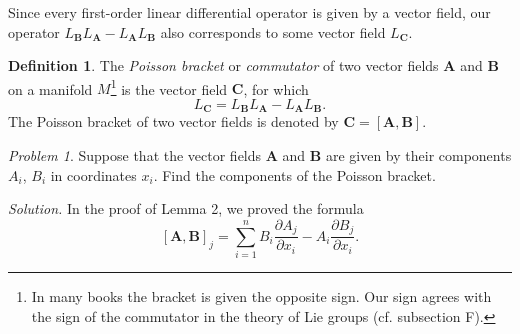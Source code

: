 \documentclass[leqno]{report}
\numberwithin{equation}{section}
\theoremstyle{plain}
\theoremstyle{definition}
\newtheorem*{defn*}{Definition}
\theoremstyle{remark}
\theoremstyle{smallcap}
\newtheorem*{prob*}{Problem}
\numberwithin{prob}{section}
\newcommand{\solution}[1]{\textit{Solution.} #1}
\begin{document}
Since every first-order linear differential operator is given by
a vector field, our operator
$L_\mathbf{B} L_\mathbf{A} - L_\mathbf{A} L_\mathbf{B}$
also corresponds to some vector field $L_\mathbf{C}$.


\begin{defn*}
  The \emph{Poisson bracket} or \emph{commutator}
  of two vector fields $\mathbf A$ and $\mathbf B$
  on a manifold $M$\footnote{In many books the bracket
    is given the opposite sign.
    Our sign agrees with  the sign of the commutator
    in the theory of Lie groups (cf. subsection F).}
  is the vector field $\mathbf C$, for which
  $$
  L_\mathbf{C} = L_\mathbf{B} L_\mathbf{A} - L_\mathbf{A} L_\mathbf{B}.
  $$
  The Poisson bracket of two vector fields is denoted by
  $\mathbf C = [ \mathbf A, \mathbf B ]$.
\end{defn*}

\begin{prob*}
  Suppose that the vector fields $\mathbf A$ and $\mathbf B$
  are given by their components $A_i$, $B_i$ in coordinates $x_i$.
  Find the components of the Poisson bracket.

  \solution{
    In the proof of Lemma 2, we proved the formula
    $$
    [\mathbf A, \mathbf B]_j =
    \sum_{i = 1}^n
      B_i \frac{ \partial A_j }{ \partial x_i }
      -
      A_i \frac{ \partial B_j }{ \partial x_i }.
    $$
  }
\end{prob*}
\end{document}
